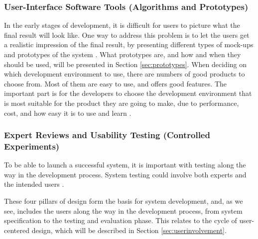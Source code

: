 \subsubsection{User-Interface Software Tools (Algorithms and Prototypes)}
In the early stages of development, it is difficult for users to picture what the final result will look like. One way to address this problem is to let the users get a realistic impression of the final result, by presenting different types of mock-ups and prototypes of the system \cite{mmi}. What prototypes are, and how and when they should be used, will be presented in Section \ref{sec:prototypes}. When deciding on which development environment to use, there are numbers of good products to choose from. Most of them are easy to use, and offers good features. The important part is for the developers to choose the development environment that is most suitable for the product they are going to make, due to performance, cost, and how easy it is to use and learn \cite{mmi}.
	
\subsubsection{Expert Reviews and Usability Testing (Controlled Experiments)}
To be able to launch a successful system, it is important with testing along the way in the development process. System testing could involve both experts and the intended users \cite{mmi}. 

These four pillars of design form the basis for system development, and, as we see, includes the users along the way in the development process, from system specification to the testing and evaluation phase. This relates to the cycle of user-centered design, which will be described in Section \ref{sec:userinvolvement}.     

